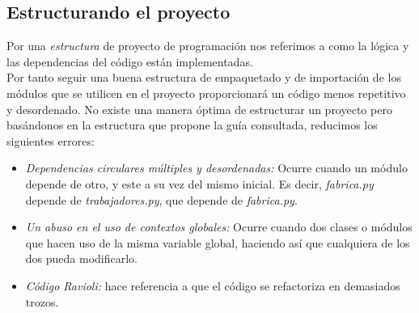 \subsection*{Estructurando el proyecto}
\label{subsec:structurePython}
Por una \emph{estructura} de proyecto de programación nos referimos a como la lógica y las dependencias del código están implementadas. \\
Por tanto seguir una buena estructura de empaquetado y de importación de los módulos que se utilicen en el proyecto proporcionará un código menos repetitivo y desordenado. No existe una manera óptima de estructurar un proyecto pero basándonos en la estructura que propone la guía consultada, reducimos los siguientes errores:
\begin{itemize}
    \item \textit{Dependencias circulares múltiples y desordenadas:} Ocurre cuando un módulo depende de otro, y este a su vez del mismo inicial. Es decir, \textit{fabrica.py} depende de \textit{trabajadores.py}, que depende de \textit{fabrica.py}.
    \item \textit{Un abuso en el uso de contextos globales:} Ocurre cuando dos clases o módulos que hacen uso de la misma variable global, haciendo así que cualquiera de los dos pueda modificarlo.
    \item \textit{Código Ravioli:} hace referencia a que el código se refactoriza en demasiados trozos.
\end{itemize}


